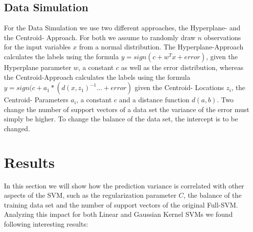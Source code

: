 \documentclass[a4paper]{article}
\begin{document}
\subsection{Data Simulation}
For the Data Simulation we use two different approaches, the Hyperplane- and the Centroid- Approach. For both we assume to randomly draw $n$ observations for the input variables $x$ from a normal distribution. The Hyperplane-Approach calculates the labels using the formula $y= sign(c+ w^T x + error)$, given the Hyperplane parameter $w$, a constant $c$ as well as the error distribution, whereas the Centroid-Approach calculates the labels using the formula $y= sign(c + a_1*(d(x,z_1)^{-1}... + error)$ given the Centroid- Locations $z_i$, the Centroid- Parameters  $a_i$, a constant $c$ and a distance function $d(a,b)$.
Two change the number of support vectors of a data set the variance of the error must simply be higher. To change the balance of the data set, the intercept is to be changed.


\section{Results}

In this section we will show how the prediction variance is correlated with other aspects of the SVM, such as the regularization parameter $C$, the balance of the training data set and the number of support vectors of the original Full-SVM. Analyzing this impact for both Linear  and Gaussian Kernel SVMs we found following interesting results:
\end{document}
